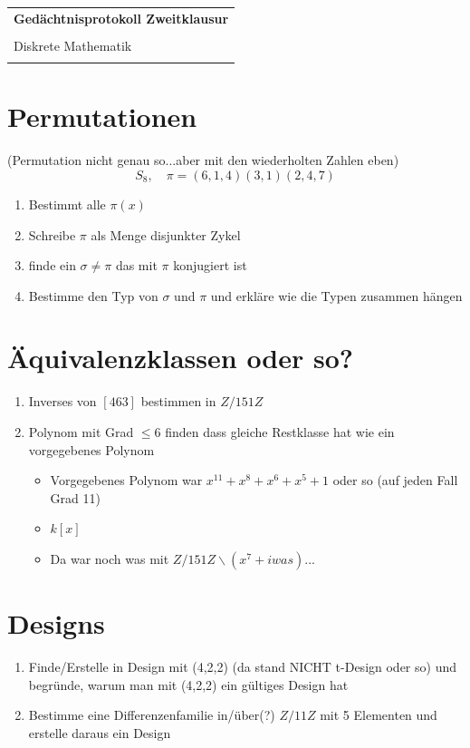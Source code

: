 \documentclass{article} %
\newcommand{\titulo}{Gedächtnisprotokoll Zweitklausur}
\newcommand{\nombre}{Diskrete Mathematik}
\begin{document}
\begin{tabular}{p{12cm}}
{{\Large\bf\titulo}}\\
\vspace{0.2cm}\\
 {\large\nombre}\\
 \vspace{0.1cm}
\end{tabular} 



\section{Permutationen}
(Permutation nicht genau so...aber mit den wiederholten Zahlen eben)
\begin{equation*}
    S_8, \quad \pi = (6,1,4)(3,1)(2,4,7)
\end{equation*}

\begin{enumerate}
    \item Bestimmt alle $\pi(x)$
    \item Schreibe $\pi$ als Menge disjunkter Zykel
    \item finde ein $\sigma \neq \pi$ das mit $\pi$ konjugiert ist 
    \item Bestimme den Typ von $\sigma$ und $\pi$ und erkläre wie die Typen zusammen hängen 
\end{enumerate}

\section{Äquivalenzklassen oder so?}
\begin{enumerate}
    \item Inverses von $[463]$ bestimmen in $Z / 151 Z$
    \item Polynom mit Grad $\leq 6$ finden dass gleiche Restklasse hat wie ein vorgegebenes Polynom 
    \begin{itemize}
        \item Vorgegebenes Polynom war $x^{11} + x^8 + x^6 + x^5 + 1$ oder so (auf jeden Fall Grad 11) 
        \item $k[x]$
        \item Da war noch was mit $Z / 151 Z \backslash (x^7 + iwas)$...
    \end{itemize}
\end{enumerate}

\section{Designs}
\begin{enumerate}
    \item Finde/Erstelle in Design mit (4,2,2) (da stand NICHT t-Design oder so) und begründe, warum man mit (4,2,2) ein gültiges Design hat 
    \item Bestimme eine Differenzenfamilie in/über(?) $Z/11Z$ mit 5 Elementen und erstelle daraus ein Design
\end{enumerate}
\end{document}
